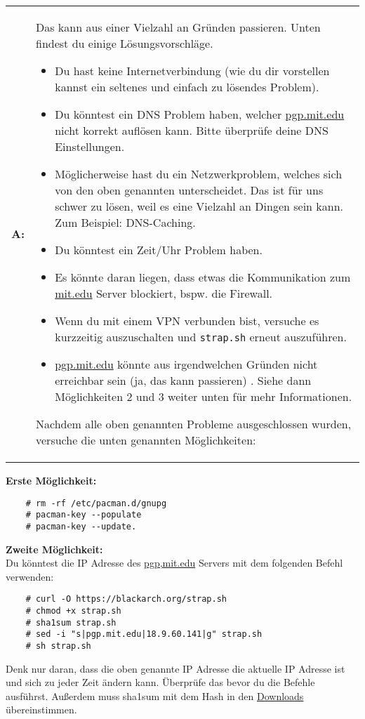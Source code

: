 \begin{tabularx}{\linewidth}{lX}
		\textbf{A:} &  Das kann aus einer Vielzahl an Gründen passieren. Unten findest du einige Lösungsvorschläge.
		\begin{itemize}
			\item Du hast keine Internetverbindung (wie du dir vorstellen kannst ein seltenes und einfach zu lösendes Problem).
			\item Du könntest ein DNS Problem haben, welcher \url{pgp.mit.edu} nicht korrekt auflösen kann. Bitte überprüfe deine DNS Einstellungen.
			\item Möglicherweise hast du ein Netzwerkproblem, welches sich von den oben genannten unterscheidet. Das ist für uns schwer zu lösen, weil es eine Vielzahl an Dingen sein kann. Zum Beispiel: DNS-Caching.
			\item Du könntest ein Zeit/Uhr Problem haben.
			\item Es könnte daran liegen, dass etwas die Kommunikation zum \url{mit.edu} Server blockiert, bspw. die Firewall.
			\item Wenn du mit einem VPN verbunden bist, versuche es kurzzeitig auszuschalten und \texttt{strap.sh} erneut auszuführen.
			\item \url{pgp.mit.edu} könnte aus irgendwelchen Gründen nicht erreichbar sein (ja, das kann passieren) . Siehe dann Möglichkeiten 2 und 3 weiter unten für mehr Informationen.
		\end{itemize}
		Nachdem alle oben genannten Probleme ausgeschlossen wurden, versuche die unten genannten Möglichkeiten:
\end{tabularx}
\textbf{Erste Möglichkeit:}
\begin{lstlisting}
	# rm -rf /etc/pacman.d/gnupg
	# pacman-key --populate
	# pacman-key --update.
\end{lstlisting}
\vspace{0.5cm}

\textbf{Zweite Möglichkeit:}\\
Du könntest die IP Adresse des \url{pgp,mit.edu} Servers mit dem folgenden Befehl verwenden:
\begin{lstlisting}
	# curl -O https://blackarch.org/strap.sh
	# chmod +x strap.sh
	# sha1sum strap.sh
	# sed -i "s|pgp.mit.edu|18.9.60.141|g" strap.sh
	# sh strap.sh
\end{lstlisting}
Denk nur daran, dass die oben genannte IP Adresse die aktuelle IP Adresse ist und sich zu jeder Zeit ändern kann. Überprüfe das bevor du die Befehle ausführst. Außerdem muss sha1sum mit dem Hash in den \href{https://blackarch.org/downloads.html}{Downloads} übereinstimmen.
\vspace{0.5cm}

